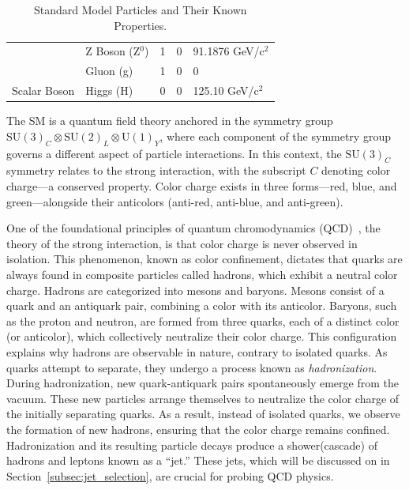 \begin{table}[ht]
\begin{tabular}{|l|l|l|l|l|}
                       & Z Boson (Z\(^0\))          & 1             & 0                & 91.1876 GeV/c\(^2\)       \\ \cline{2-5}
                       & Gluon (g)             & 1             & 0                & 0                         \\ \hline
Scalar Boson           & Higgs (H)             & 0             & 0                & 125.10 GeV/c\(^2\)       \\ \hline
\end{tabular}
\caption{Standard Model Particles and Their Known Properties.}
\label{table:SMparticles}
\end{table}

The SM is a quantum field theory anchored in the symmetry group $\mathrm{SU}(3)_C \otimes \mathrm{SU}(2)_L \otimes \mathrm{U}(1)_Y$, where each component of the symmetry group governs a different aspect of particle interactions. In this context, the $\mathrm{SU}(3)_C$ symmetry relates to the strong interaction, with the subscript $C$ denoting color charge—a conserved property. Color charge exists in three forms—red, blue, and green—alongside their anticolors (anti-red, anti-blue, and anti-green). 

One of the foundational principles of quantum chromodynamics (QCD)~\cite{CampbellHustonKrauss2017}, the theory of the strong interaction, is that color charge is never observed in isolation. This phenomenon, known as color confinement, dictates that quarks are always found in composite particles called hadrons, which exhibit a neutral color charge. 
Hadrons are categorized into mesons and baryons. Mesons consist of a quark and an antiquark pair, combining a color with its anticolor. Baryons, such as the proton and neutron, are formed from three quarks, each of a distinct color (or anticolor), which collectively neutralize their color charge. This configuration explains why hadrons are observable in nature, contrary to isolated quarks.
As quarks attempt to separate, they undergo a process known as \emph{hadronization}. During hadronization, new quark-antiquark pairs spontaneously emerge from the vacuum. These new particles arrange themselves to neutralize the color charge of the initially separating quarks. As a result, instead of isolated quarks, we observe the formation of new hadrons, ensuring that the color charge remains confined.
Hadronization and its resulting particle decays produce a shower(cascade) of hadrons and leptons known as a ``jet.'' These jets, which will be discussed on in Section~\ref{subsec:jet_selection}, are crucial for probing QCD physics. 

